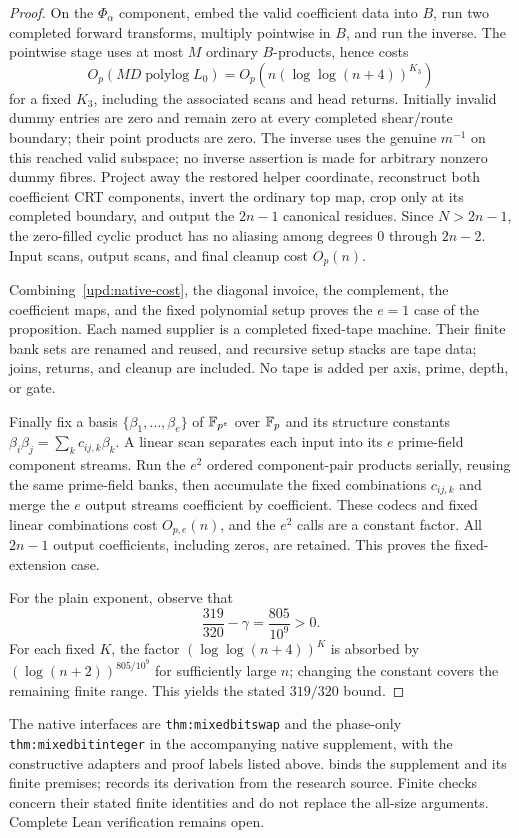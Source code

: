 \begin{proof}
On the $\Phi_\alpha$ component, embed the valid coefficient data into
$B$, run two completed forward transforms, multiply pointwise in $B$, and
run the inverse. The pointwise stage uses at most $M$ ordinary
$B$-products, hence costs
\[
  O_p(MD\operatorname{polylog}L_0)
     =O_p(n(\log\log(n+4))^{K_3})
\]
for a fixed $K_3$, including the associated scans and head returns.
Initially invalid dummy entries are zero and remain zero
at every completed shear/route boundary; their point products are zero.
The inverse uses the genuine $m^{-1}$ on this reached valid subspace; no
inverse assertion is made for arbitrary nonzero dummy fibres.  Project
away the restored helper coordinate, reconstruct both coefficient CRT
components, invert the ordinary top map, crop only at its completed
boundary, and output the $2n-1$ canonical residues.  Since $N>2n-1$, the
zero-filled cyclic product has no aliasing among degrees $0$ through
$2n-2$.  Input scans, output scans, and final cleanup cost $O_p(n)$.

Combining~\eqref{upd:native-cost}, the diagonal invoice, the complement,
the coefficient maps, and the fixed polynomial setup proves the
$e=1$ case of the proposition.  Each named supplier is a completed
fixed-tape machine.  Their finite bank sets are renamed and reused, and
recursive setup stacks are tape data; joins, returns, and cleanup are
included.  No tape is added per axis, prime, depth, or gate.

Finally fix a basis $\{\beta_1,\ldots,\beta_e\}$ of $\mathbb F_{p^e}$ over
$\mathbb F_p$ and its structure constants
$\beta_i\beta_j=\sum_k c_{ij,k}\beta_k$.  A linear scan separates each
input into its $e$ prime-field component streams.  Run the $e^2$ ordered
component-pair products serially, reusing the same prime-field banks, then
accumulate the fixed combinations $c_{ij,k}$ and merge the $e$ output
streams coefficient by coefficient.  These codecs and fixed linear
combinations cost $O_{p,e}(n)$, and the $e^2$ calls are a constant factor.
All $2n-1$ output coefficients, including zeros, are retained.  This
proves the fixed-extension case.

For the plain exponent, observe that
\[
  \frac{319}{320}-\gamma
     =\frac{805}{10^9}>0.
\]
For each fixed $K$, the factor $(\log\log(n+4))^K$ is absorbed by
$(\log(n+2))^{805/10^9}$ for sufficiently large $n$; changing the
constant covers the remaining finite range.  This yields the stated
$319/320$ bound.
\end{proof}

\begin{remark}
\label{upd:boundary}
The native interfaces are \texttt{thm:mixedbitswap} and the phase-only
\texttt{thm:mixedbitinteger} in the accompanying native supplement,
with the constructive adapters and proof labels listed above.
 binds the supplement and its finite premises;
 records its derivation from the research
source. Finite checks concern their stated finite identities and do not
replace the all-size arguments. Complete Lean verification remains open.
\end{remark}
